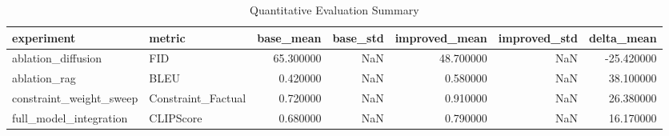 \begin{table}
\caption{Quantitative Evaluation Summary}
\begin{tabular}{llrrrrr}
\toprule
experiment & metric & base_mean & base_std & improved_mean & improved_std & delta_mean \\
\midrule
ablation_diffusion & FID & 65.300000 & NaN & 48.700000 & NaN & -25.420000 \\
ablation_rag & BLEU & 0.420000 & NaN & 0.580000 & NaN & 38.100000 \\
constraint_weight_sweep & Constraint_Factual & 0.720000 & NaN & 0.910000 & NaN & 26.380000 \\
full_model_integration & CLIPScore & 0.680000 & NaN & 0.790000 & NaN & 16.170000 \\
\bottomrule
\end{tabular}
\end{table}
